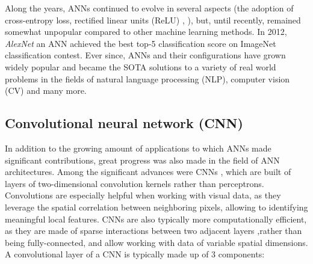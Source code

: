 Along the years, ANNs continued to evolve in several aspects (\eg the adoption of cross-entropy loss, rectified linear units (ReLU) \cite{nair2010rectified}, \etc), but, until recently, remained somewhat unpopular compared to other machine learning methods.
In 2012, \emph{AlexNet} \cite{10.5555/2999134.2999257} an ANN achieved the best top-5 classification score on ImageNet \cite{5206848} classification contest.
Ever since, ANNs and their configurations have grown widely popular and became the SOTA solutions to a variety of real world problems in the fields of natural language processing (NLP), computer vision (CV) and many more.

\subsection{Convolutional neural network (CNN)}
In addition to the growing amount of applications to which ANNs made significant contributions, great progress was also made in the field of ANN architectures.
Among the significant advances were CNNs \cite{lecun1995convolutional}, which are built of layers of two-dimensional convolution kernels rather than perceptrons.
Convolutions are especially helpful when working with visual data, as they leverage the spatial correlation between neighboring pixels, allowing to identifying meaningful local features.
CNNs are also typically more computationally efficient, as they are made of sparse interactions between two adjacent layers \cite{Goodfellow-et-al-2016},rather than being fully-connected, and allow working with data of variable spatial dimensions.
A convolutional layer of a CNN is typically made up of 3 components:
